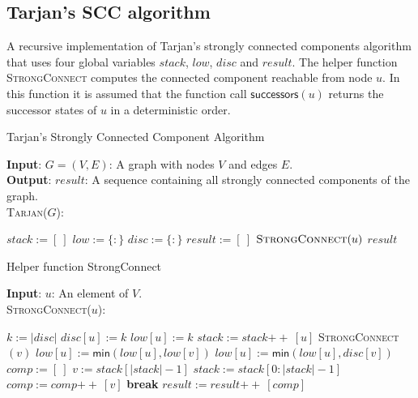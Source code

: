 \documentclass{article}
\newcommand{\concat}{\ensuremath{+\!\!+\:}}
\newcommand{\emptymap}{\ensuremath{\{ : \}}}
\newcommand{\emptylist}{\ensuremath{[\:]}}
\begin{document}
\subsection{Tarjan's SCC algorithm}
A recursive implementation of Tarjan's strongly connected components algorithm that uses four global variables $stack$, $low$, $disc$ and $result$. The helper function
\textsc{StrongConnect} computes the connected component reachable from node $u$. In this function it is assumed that the function call $\textsf{successors}(u)$ returns the successor states of $u$ in a deterministic order.

\begin{algorithm}
\small
\caption{Tarjan's Strongly Connected Component Algorithm}
\vspace*{1ex}
{\textbf {Input}:}
$G=(V,E)$: A graph with nodes $V$ and edges $E$.\\
{\textbf {Output}:}
$result$: A sequence containing all strongly connected components of the graph.\\
{\textsc{Tarjan}($G$):}
\begin{algorithmic}[1]
\State $stack := \emptylist$
\State $low := \emptymap$         \Comment{the empty mapping is denoted as $\emptymap$}
\State $disc := \emptymap$    
\State $result := \emptylist$
 \label{line:mainloop}
     { $\textsc{StrongConnect}(u)$ } \EndIf
\EndFor
\State \Return $result$
\end{algorithmic}
\end{algorithm}

\begin{algorithm}
\small
\caption{Helper function StrongConnect}
\vspace*{1ex}
{\textbf {Input}:}
$u$: An element of $V$.\\
{\textsc{StrongConnect}($u$):}
\begin{algorithmic}[1]
\State $k := |disc|$ 
\State $disc[u] := k$
\State $low[u] := k$ 
\State $stack := stack \concat [u]$
        \State \textsc{StrongConnect}$(v)$
        \State $low[u] := \textsf{min}(low[u], low[v])$
        \State $low[u] := \textsf{min}(low[u], disc[v])$ \label{line:low_assignment}
    \EndIf
\EndFor
{} 
    \State $comp := \emptylist$
        \State $v := stack[|stack| - 1]$ 
        \State $stack := stack[0:|stack| - 1]$ 
        \State $comp := comp \concat [v]$
         {\textbf{break}} \EndIf
    \EndWhile
    \State $result := result \concat [comp]$ \label{line:result}
\EndIf
\end{algorithmic}
\end{algorithm}
\end{document}
